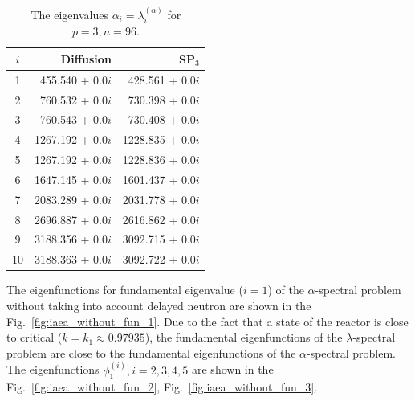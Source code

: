 \documentclass[authoryear]{elsarticle}
\begin{document}
\begin{table}[h]
\caption{The eigenvalues $\alpha_i=\lambda_i^{(\alpha)}$ for $p=3, n=96$.}
\label{tab:iaea_without_alpha_10}
\begin{center}
\begin{tabular}{c r r}
\hline
$i$ & Diffusion & SP$_3$ \\
\hline
1 & 455.540 + 0.0$i$& 428.561 + 0.0$i$ \\
2 & 760.532 + 0.0$i$& 730.398 + 0.0$i$ \\
3 & 760.543 + 0.0$i$& 730.408 + 0.0$i$ \\
4 & 1267.192 + 0.0$i$&1228.835 + 0.0$i$ \\
5 & 1267.192 + 0.0$i$&1228.836 + 0.0$i$ \\
6 & 1647.145 + 0.0$i$&1601.437 + 0.0$i$ \\
7 & 2083.289 + 0.0$i$&2031.778 + 0.0$i$ \\
8 & 2696.887 + 0.0$i$&2616.862 + 0.0$i$ \\
9 & 3188.356 + 0.0$i$&3092.715 + 0.0$i$ \\
10& 3188.363 + 0.0$i$&3092.722 + 0.0$i$ \\
\hline
\end{tabular}
\end{center}
\end{table}

The eigenfunctions for fundamental eigenvalue ($i=1$) of the $\alpha$-spectral problem without taking into account delayed neutron are shown in the Fig.~\ref{fig:iaea_without_fun_1}. 
Due to the fact that a state of the reactor is close to critical ($k=k_1\approx 0.97935$), the fundamental eigenfunctions of the $\lambda$-spectral problem are close to the fundamental eigenfunctions of the $\alpha$-spectral problem.
The eigenfunctions $\phi_1^{(i)}, i=2,3,4,5$ are shown in the Fig.~\ref{fig:iaea_without_fun_2}, Fig.~\ref{fig:iaea_without_fun_3}.
\end{document}
